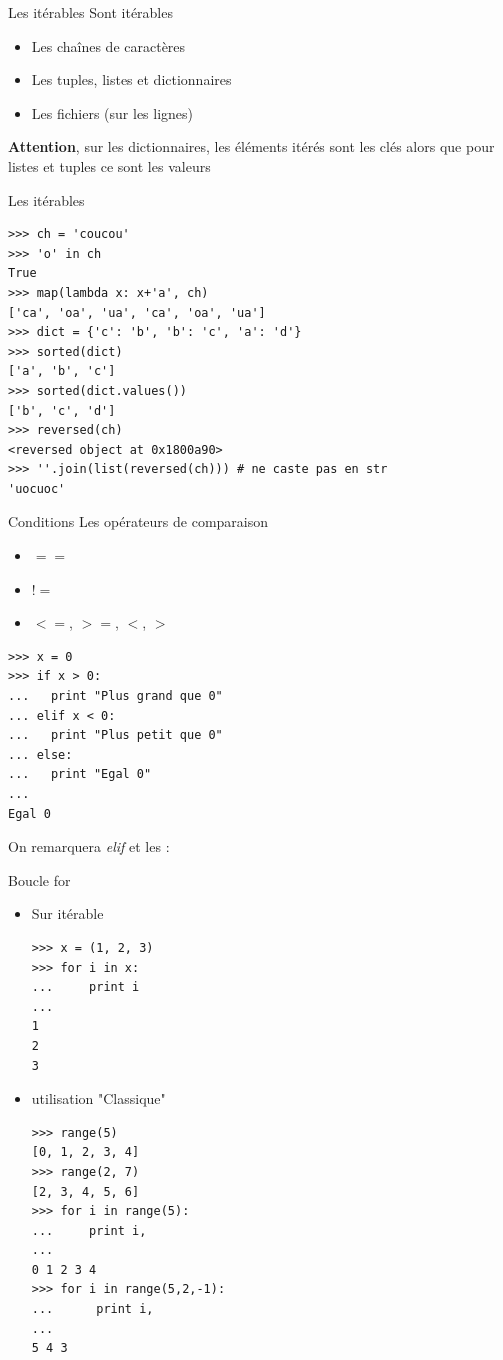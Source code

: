 \documentclass{beamer}
\begin{document}
\begin{frame}[fragile]{Les itérables}
Sont itérables
\begin{itemize}
 \item Les chaînes de caractères
 \item Les tuples, listes et dictionnaires
 \item Les fichiers (sur les lignes)
\end{itemize}

\textbf{Attention}, sur les dictionnaires, les éléments itérés sont les clés alors que pour listes et tuples ce sont les valeurs

\end{frame}

\begin{frame}[fragile]{Les itérables}
\begin{lstlisting}
>>> ch = 'coucou'
>>> 'o' in ch
True
>>> map(lambda x: x+'a', ch)
['ca', 'oa', 'ua', 'ca', 'oa', 'ua']
>>> dict = {'c': 'b', 'b': 'c', 'a': 'd'}
>>> sorted(dict)
['a', 'b', 'c']
>>> sorted(dict.values())
['b', 'c', 'd']
>>> reversed(ch)
<reversed object at 0x1800a90>
>>> ''.join(list(reversed(ch))) # ne caste pas en str
'uocuoc'
\end{lstlisting}
\end{frame}


\begin{frame}[fragile]{Conditions}
Les opérateurs de comparaison
\begin{itemize}
 \item $==$
 \item $!=$
 \item $<=$, $>=$, $<$, $>$
\end{itemize}

\begin{lstlisting}
>>> x = 0
>>> if x > 0:
...   print "Plus grand que 0"
... elif x < 0:
...   print "Plus petit que 0"
... else:
...   print "Egal 0"
... 
Egal 0
\end{lstlisting}

On remarquera \textit{elif} et les :

\end{frame}


\begin{frame}[fragile]{Boucle for}
\begin{itemize}
 \item Sur itérable
\begin{lstlisting}[multicols=2]
>>> x = (1, 2, 3)
>>> for i in x:
...     print i
... 
1
2
3
\end{lstlisting}

 \item utilisation "Classique"
\begin{lstlisting}[multicols=2]
>>> range(5)
[0, 1, 2, 3, 4]
>>> range(2, 7)
[2, 3, 4, 5, 6]
>>> for i in range(5):
...     print i,
... 
0 1 2 3 4
>>> for i in range(5,2,-1):
...      print i,
... 
5 4 3
\end{lstlisting}

\end{itemize}

\end{frame}
\end{document}
